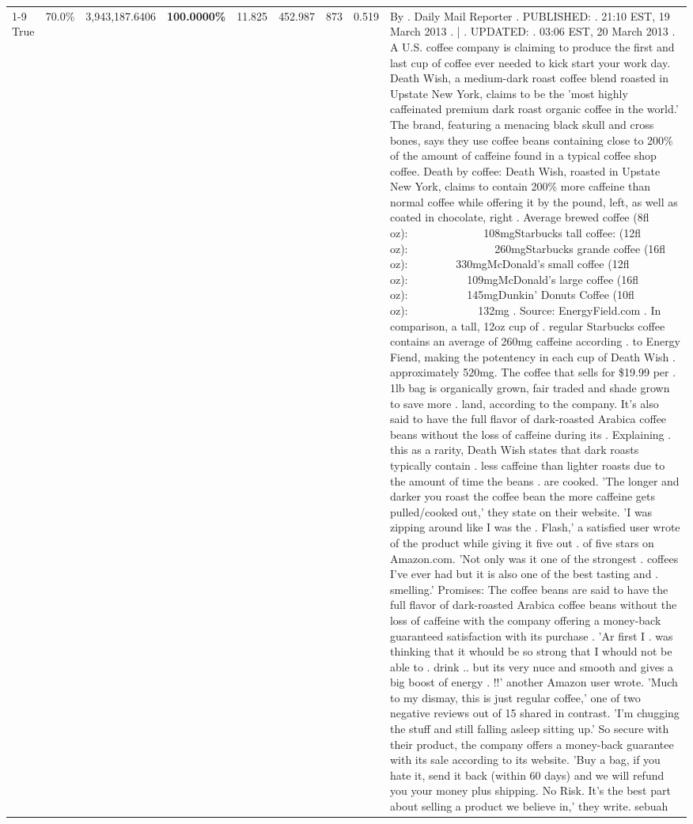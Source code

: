 \begin{table}[H]
{\begin{tabular}{lllrlllll}
\cline{1-9}
True & 70.0\% & 3,943,187.6406 & \bfseries \color{red} 100.0000\% & 11.825 & 452.987 & 873 & 0.519 & By . Daily Mail Reporter . PUBLISHED: . 21:10 EST, 19 March 2013 . | . UPDATED: . 03:06 EST, 20 March 2013 . A U.S. coffee company is claiming to produce the first and last cup of coffee ever needed to kick start your work day. Death Wish, a medium-dark roast coffee blend roasted in Upstate New York, claims to be the 'most highly caffeinated premium dark roast organic coffee in the world.' The brand, featuring a menacing black skull and cross bones, says they use coffee beans containing close to 200\% of the amount of caffeine found in a typical coffee shop coffee. Death by coffee: Death Wish, roasted in Upstate New York, claims to contain 200\% more caffeine than normal coffee while offering it by the pound, left, as well as coated in chocolate, right . Average brewed coffee (8fl oz):              108mgStarbucks tall coffee: (12fl oz):                260mgStarbucks grande coffee (16fl oz):         330mgMcDonald's small coffee (12fl oz):           109mgMcDonald's large coffee (16fl oz):           145mgDunkin' Donuts Coffee (10fl oz):             132mg . Source: EnergyField.com . In comparison, a tall, 12oz cup of . regular Starbucks coffee contains an average of 260mg caffeine according . to Energy Fiend, making the potentency in each cup of Death Wish . approximately 520mg. The coffee that sells for \$19.99 per . 1lb bag is organically grown, fair traded and shade grown to save more . land, according to the company. It's also said to have the full flavor of dark-roasted Arabica coffee beans without the loss of caffeine during its . Explaining . this as a rarity, Death Wish states that dark roasts typically contain . less caffeine than lighter roasts due to the amount of time the beans . are cooked. 'The longer and darker you roast the coffee bean the more caffeine gets pulled/cooked out,' they state on their website. 'I was zipping around like I was the . Flash,' a satisfied user wrote of the product while giving it five out . of five stars on Amazon.com. 'Not only was it one of the strongest . coffees I've ever had but it is also one of the best tasting and . smelling.’ Promises: The coffee beans are said to have the full flavor of dark-roasted Arabica coffee beans without the loss of caffeine with the company offering a money-back guaranteed satisfaction with its purchase . 'Ar first I . was thinking that it whould be so strong that I whould not be able to . drink .. but its very nuce and smooth and gives a big boost of energy . !!' another Amazon user wrote. 'Much to my dismay, this is just regular coffee,' one of two negative reviews out of 15 shared in contrast. 'I'm chugging the stuff and still falling asleep sitting up.' So secure with their product, the company offers a money-back guarantee with its sale according to its website. 'Buy a bag, if you hate it, send it back (within 60 days) and we will refund you your money plus shipping. No Risk. It’s the best part about selling a product we believe in,' they write. sebuah \\

\end{tabular}}
\end{table}
